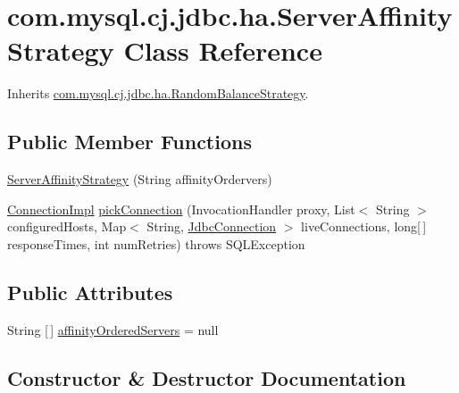\hypertarget{classcom_1_1mysql_1_1cj_1_1jdbc_1_1ha_1_1_server_affinity_strategy}{}\section{com.\+mysql.\+cj.\+jdbc.\+ha.\+Server\+Affinity\+Strategy Class Reference}
\label{classcom_1_1mysql_1_1cj_1_1jdbc_1_1ha_1_1_server_affinity_strategy}


Inherits \mbox{\hyperlink{classcom_1_1mysql_1_1cj_1_1jdbc_1_1ha_1_1_random_balance_strategy}{com.\+mysql.\+cj.\+jdbc.\+ha.\+Random\+Balance\+Strategy}}.

\subsection*{Public Member Functions}
\begin{DoxyCompactItemize}
\item 
\mbox{\hyperlink{classcom_1_1mysql_1_1cj_1_1jdbc_1_1ha_1_1_server_affinity_strategy_a084e3a46f4b73b2407e65fecc82999c1}{Server\+Affinity\+Strategy}} (String affinity\+Ordervers)
\item 
\mbox{\hyperlink{classcom_1_1mysql_1_1cj_1_1jdbc_1_1_connection_impl}{Connection\+Impl}} \mbox{\hyperlink{classcom_1_1mysql_1_1cj_1_1jdbc_1_1ha_1_1_server_affinity_strategy_adea6043b91b0a489e31de053e0f4cd25}{pick\+Connection}} (Invocation\+Handler proxy, List$<$ String $>$ configured\+Hosts, Map$<$ String, \mbox{\hyperlink{interfacecom_1_1mysql_1_1cj_1_1jdbc_1_1_jdbc_connection}{Jdbc\+Connection}} $>$ live\+Connections, long\mbox{[}$\,$\mbox{]} response\+Times, int num\+Retries)  throws S\+Q\+L\+Exception 
\end{DoxyCompactItemize}
\subsection*{Public Attributes}
\begin{DoxyCompactItemize}
\item 
String \mbox{[}$\,$\mbox{]} \mbox{\hyperlink{classcom_1_1mysql_1_1cj_1_1jdbc_1_1ha_1_1_server_affinity_strategy_a96c78033614870596e5cac05d283ff84}{affinity\+Ordered\+Servers}} = null
\end{DoxyCompactItemize}


\subsection{Constructor \& Destructor Documentation}
\mbox{\label{classcom_1_1mysql_1_1cj_1_1jdbc_1_1ha_1_1_server_affinity_strategy_a084e3a46f4b73b2407e65fecc82999c1}} 
